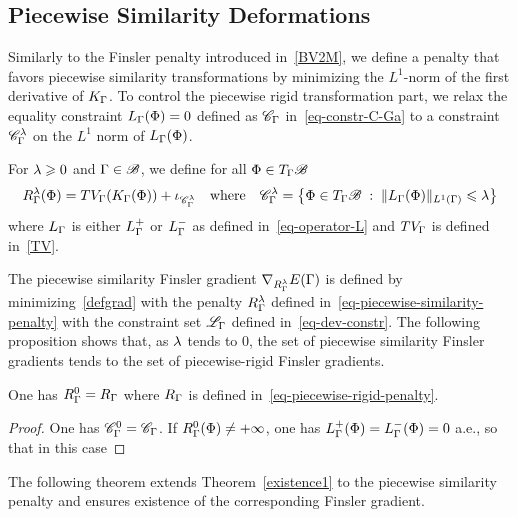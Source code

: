 \subsection{Piecewise Similarity Deformations}


Similarly to the Finsler penalty introduced in~\ref{BV2M}, we define a penalty that favors piecewise similarity transformations  by minimizing  the $L^1$-norm of the first derivative of $K_\Gamma$. To control the piecewise rigid transformation part, we relax the equality constraint $L_\Gamma(\Phi)=0$ defined as $\mathcal{C}_\Gamma$ in~\eqref{eq-constr-C-Ga} to  a constraint $\mathcal{C}_\Gamma^\lambda$ on the $L^1$ norm of $L_\Gamma(\Phi)$. 


\begin{defn}\label{defn2} For $\lambda \geqslant 0$ and $\Gamma \in \mathcal{B}$, we define for all $\Phi \in T_\Gamma\mathcal{B}$
\begin{equation}\label{eq-piecewise-similarity-penalty}
	R_\Gamma^\lambda(\Phi) =
	TV_\Gamma(K_\Gamma(\Phi) )
	+ \iota_{\mathcal{C}_\Gamma^\lambda}
	\quad \text{where} \quad
	\mathcal{C}_\Gamma^\lambda = \left\{  \Phi \in T_\Gamma \mathcal{B}  \;:\; 
			\| L_\Gamma(\Phi) \|_{L^1(\Gamma)}\leqslant \lambda  \right\}
\end{equation}
where $L_\Gamma$ is either $L_\Gamma^+$ or $L_\Gamma^-$ as defined in~\eqref{eq-operator-L} and $TV_\Gamma$ is defined in~\eqref{TV}.
\end{defn}


The piecewise similarity Finsler gradient $\nabla_{R_\Gamma^\lambda}E(\Gamma)$ is defined by minimizing~\eqref{defgrad} with the penalty $R_\Gamma^\lambda$ defined in~\eqref{eq-piecewise-similarity-penalty} with the constraint set $\mathcal{L}_\Gamma$ defined in~\eqref{eq-dev-constr}.  The following proposition shows that, as $\lambda$ tends to 0, the set of piecewise similarity Finsler gradients tends to the set of piecewise-rigid Finsler gradients. 

\begin{prop}
	One has $R_\Gamma^0 = R_\Gamma$ where $R_\Gamma$ is defined in~\eqref{eq-piecewise-rigid-penalty}.
\end{prop}
\begin{proof}
One has $\mathcal{C}^0_\Gamma = \mathcal{C}_\Gamma$.
If $R_\Gamma^0(\Phi) \neq +\infty$, one has $L_\Gamma^{+}(\Phi)=L_\Gamma^{-}(\Phi)=0$ a.e., so that in this case 
\end{proof}
The following theorem extends Theorem~\ref{existence1} to the piecewise similarity penalty and ensures existence of the corresponding Finsler gradient.

